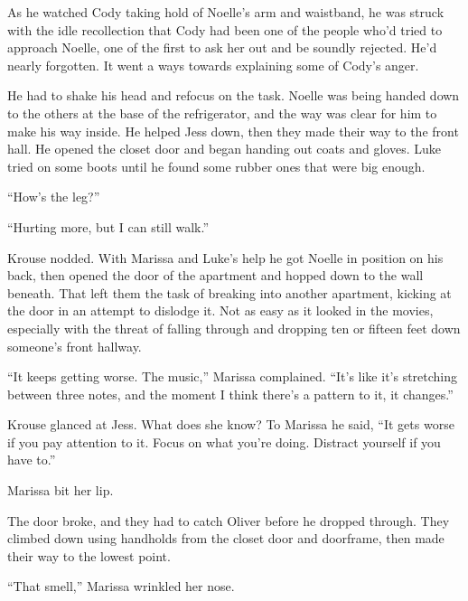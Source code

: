 As he watched Cody taking hold of Noelle's arm and waistband, he was struck with the idle recollection that Cody had been one of the people who'd tried to approach Noelle, one of the first to ask her out and be soundly rejected.  He'd nearly forgotten.  It went a ways towards explaining some of Cody's anger.



He had to shake his head and refocus on the task.  Noelle was being handed down to the others at the base of the refrigerator, and the way was clear for him to make his way inside.  He helped Jess down, then they made their way to the front hall.  He opened the closet door and began handing out coats and gloves.  Luke tried on some boots until he found some rubber ones that were big enough.



``How's the leg?''



``Hurting more, but I can still walk.''



Krouse nodded.  With Marissa and Luke's help he got Noelle in position on his back, then opened the door of the apartment and hopped down to the wall beneath.  That left them the task of breaking into another apartment, kicking at the door in an attempt to dislodge it.  Not as easy as it looked in the movies, especially with the threat of falling through and dropping ten or fifteen feet down someone's front hallway.



``It keeps getting worse.  The music,'' Marissa complained.  ``It's like it's stretching between three notes, and the moment I think there's a pattern to it, it changes.''



Krouse glanced at Jess.  What does she know?  To Marissa he said, ``It gets worse if you pay attention to it.  Focus on what you're doing.  Distract yourself if you have to.''



Marissa bit her lip.



The door broke, and they had to catch Oliver before he dropped through.  They climbed down using handholds from the closet door and doorframe, then made their way to the lowest point.



``That smell,'' Marissa wrinkled her nose.



